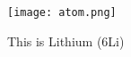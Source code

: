 \documentclass{article}
\begin{document}
\begin{figure}
\centering
\texttt{[image: atom.png]}
\caption{This is Lithium (6Li)}
\end{figure}
\end{document}
